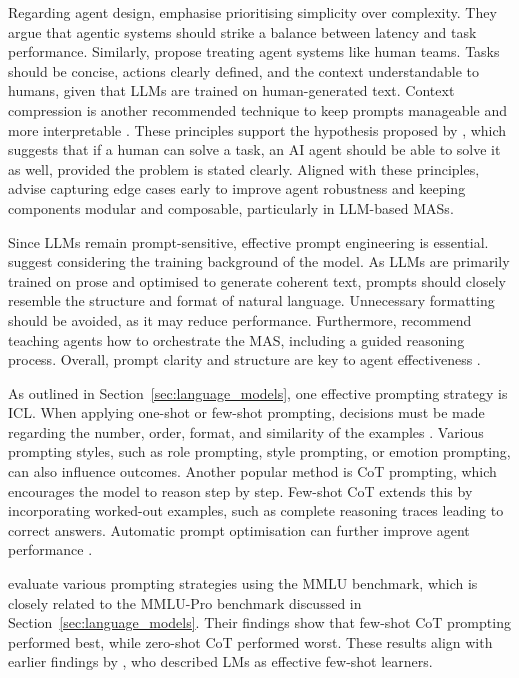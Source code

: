 \documentclass[a4paper,oneside,bibliography=totoc]{scrbook}
\begin{document}
Regarding agent design, \citet{Anthropic2024} emphasise prioritising simplicity over complexity. They argue that agentic systems should strike a balance between latency and task performance. Similarly, \citet{Hadfield2025} propose treating agent systems like human teams. Tasks should be concise, actions clearly defined, and the context understandable to humans, given that \acp{LLM} are trained on human-generated text. Context compression is another recommended technique to keep prompts manageable and more interpretable \cite{Hadfield2025}. These principles support the hypothesis proposed by \citet{Anthropic2024}, which suggests that if a human can solve a task, an \ac{AI} agent should be able to solve it as well, provided the problem is stated clearly. Aligned with these principles, \citet{OpenAI2025} advise capturing edge cases early to improve agent robustness and keeping components modular and composable, particularly in \ac{LLM}-based \acp{MAS}.

Since \acp{LLM} remain prompt-sensitive, effective prompt engineering is essential. \citet{Anthropic2024} suggest considering the training background of the model. As \acp{LLM} are primarily trained on prose and optimised to generate coherent text, prompts should closely resemble the structure and format of natural language. Unnecessary formatting should be avoided, as it may reduce performance. Furthermore, \citet{Hadfield2025} recommend teaching agents how to orchestrate the \ac{MAS}, including a guided reasoning process. Overall, prompt clarity and structure are key to agent effectiveness \cite{OpenAI2025}.

As outlined in Section~\ref{sec:language_models}, one effective prompting strategy is \ac{ICL}. When applying one-shot or few-shot prompting, decisions must be made regarding the number, order, format, and similarity of the examples \cite{Schulhoff2025}. Various prompting styles, such as role prompting, style prompting, or emotion prompting, can also influence outcomes. Another popular method is \ac{CoT} prompting, which encourages the model to reason step by step. Few-shot \ac{CoT} extends this by incorporating worked-out examples, such as complete reasoning traces leading to correct answers. Automatic prompt optimisation can further improve agent performance \cite{Schulhoff2025}.

\citet{Schulhoff2025} evaluate various prompting strategies using the MMLU benchmark, which is closely related to the MMLU-Pro benchmark discussed in Section~\ref{sec:language_models}. Their findings show that few-shot \ac{CoT} prompting performed best, while zero-shot \ac{CoT} performed worst. These results align with earlier findings by \citet{Brown2020}, who described \acp{LM} as effective few-shot learners.
\end{document}
